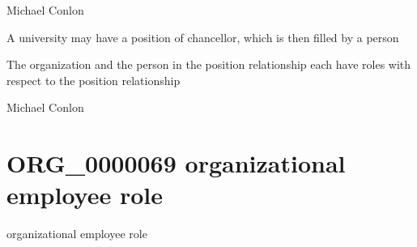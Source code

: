 \documentclass[letterpaper,10pt,english]{sphinxmanual}
\begin{document}
\begin{sphinxShadowBox}

\sphinxAtStartPar
Michael Conlon 
\end{sphinxShadowBox}

\begin{sphinxShadowBox}

\sphinxAtStartPar
A university may have a position of chancellor, which is then filled by a person
\end{sphinxShadowBox}

\begin{sphinxShadowBox}

\sphinxAtStartPar
The organization and the person in the position relationship each have roles with respect to the position relationship
\end{sphinxShadowBox}

\begin{sphinxShadowBox}

\sphinxAtStartPar
{}
\end{sphinxShadowBox}

\begin{sphinxShadowBox}

\sphinxAtStartPar
Michael Conlon 
\end{sphinxShadowBox}
\begin{quote}
\label{\detokenize{doc-ORG_0000069:org-0000069}}\label{\detokenize{doc-ORG_0000069:organizational-employee-role}}\label{\detokenize{doc-ORG_0000069:org-0000069}}
\ignorespaces \end{quote}


\section{ORG\_0000069 \sphinxhyphen{} organizational employee role}
\label{\detokenize{doc-ORG_0000069:org-0000069-organizational-employee-role}}\label{\detokenize{doc-ORG_0000069:index-0}}\label{\detokenize{doc-ORG_0000069::doc}}
\begin{sphinxShadowBox}

\sphinxAtStartPar
organizational employee role
\end{sphinxShadowBox}
\end{document}
